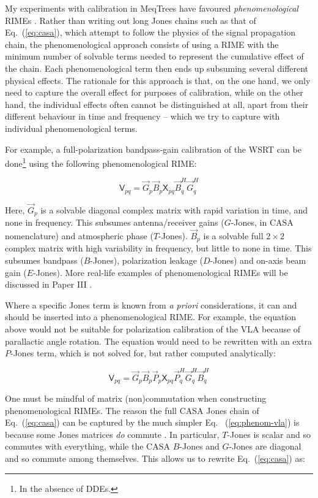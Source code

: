 \documentclass{aa}
\newcommand{\herm}{H}
\newcommand{\jones}[2]{\vec {#1}_{#2}}
\newcommand{\jonesT}[2]{\vec {#1}^{\herm}_{#2}}
\newcommand{\coh}[2]{\mathsf{{#1}}_{{#2}}}
\begin{document}
My experiments with calibration in MeqTrees have favoured \emph{phenomenological} RIMEs \citep{meqtrees}. Rather than writing out long Jones chains such as that of Eq.~(\ref{eq:casa}), which attempt to follow the physics of the signal propagation chain, the phenomenological approach consists of using a RIME with the minimum number of solvable terms needed to represent the cumulative effect of the chain. Each phenomenological term then ends up subsuming several different physical effects. The rationale for this approach is that, on the one hand, we only need to capture the overall effect for purposes of calibration, while on the other hand, the individual effects often cannot be distinguished at all, apart from their different behaviour in time and frequency -- which we try to capture with individual phenomenological terms.

For example, a full-polarization bandpass-gain calibration of the WSRT can be done\footnote{In the absence of DDEs.} using the following phenomenological RIME:

\[
\coh{V}{pq} = \jones{G}{p} \jones{B}{p} \coh{X}{pq} \jonesT{B}{q} \jonesT{G}{q} 
\]

Here, $\jones{G}{p}$ is a solvable diagonal complex matrix with rapid variation in time, and none in frequency. This subsumes antenna/receiver gains ($G$-Jones, in CASA nomenclature) and atmospheric phase ($T$-Jones). $\jones{B}{p}$ is a solvable full $2\times2$ complex matrix with high variability in frequency, but little to none in time. This subsumes bandpass ($B$-Jones), polarization leakage ($D$-Jones) and on-axis beam gain ($E$-Jones). More real-life examples of phenomenological RIMEs will be discussed in Paper III \citep{RRIME3}.

Where a specific Jones term is known from \emph{a priori} considerations, it can and should be inserted into a phenomenological RIME. For example, the equation above would not be suitable for polarization calibration of the VLA because of parallactic angle rotation. The equation would need to be rewritten with an extra $P$-Jones term, which is not solved for, but rather computed analytically:

\begin{equation}\label{eq:phenom-vla}
\coh{V}{pq} = \jones{G}{p} \jones{B}{p} \jones{P}{p} \coh{X}{pq} \jonesT{P}{q} \jonesT{G}{q} \jonesT{B}{q} 
\end{equation}

One must be mindful of matrix (non)commutation when constructing phenomenological RIMEs. The reason the full CASA Jones chain of Eq.~(\ref{eq:casa}) can be captured by the much simpler Eq. ~(\ref{eq:phenom-vla}) is because some Jones matrices \emph{do} commute \citep[see also Paper I,][Sect.~1.6]{RRIME1}. In particular, $T$-Jones is scalar and so commutes with everything, while the CASA $B$-Jones and $G$-Jones are diagonal and so commute among themselves. This allows us to rewrite Eq.~(\ref{eq:casa}) as:
\end{document}
